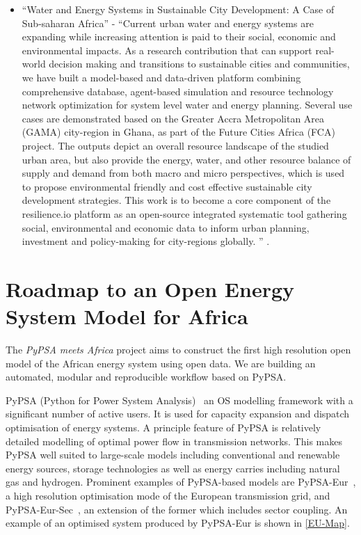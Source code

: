 \documentclass[conference, a4paper]{IEEEtran}
\begin{document}
\begin{itemize}
\item ``Water and Energy Systems in Sustainable City Development: A Case of Sub-saharan Africa'' - ``Current urban water and energy systems are expanding while increasing attention is paid to their social, economic and environmental impacts. As a research contribution that can support real-world decision making and transitions to sustainable cities and communities, we have built a model-based and data-driven platform combining comprehensive database, agent-based simulation and resource technology network optimization for system level water and energy planning. Several use cases are demonstrated based on the Greater Accra Metropolitan Area (GAMA) city-region in Ghana, as part of the Future Cities Africa (FCA) project. The outputs depict an overall resource landscape of the studied urban area, but also provide the energy, water, and other resource balance of supply and demand from both macro and micro perspectives, which is used to propose environmental friendly and cost effective sustainable city development strategies. This work is to become a core component of the resilience.io platform as an open-source integrated systematic tool gathering social, environmental and economic data to inform urban planning, investment and policy-making for city-regions globally. '' \cite{wang-vandam-ea-2017}.
\end{itemize}

\newpage
\section{Roadmap to an Open Energy System Model for Africa}

The \emph{PyPSA meets Africa} project aims to construct the first high resolution open model of the African energy system using open data.
We are building an automated, modular and reproducible workflow based on PyPSA.

PyPSA (Python for Power System Analysis)~\cite{brown-horsch-ea-2018} an OS modelling framework with a significant number of active users.
It is used for capacity expansion and dispatch optimisation of energy systems.
A principle feature of PyPSA is relatively detailed modelling of optimal power flow in transmission networks.
This makes PyPSA well suited to large-scale models including conventional and renewable energy sources, storage technologies as well as energy carries including natural gas and hydrogen.
Prominent examples of PyPSA-based models are PyPSA-Eur~\cite{PyPSAEur}, a high resolution optimisation mode of the European transmission grid, and PyPSA-Eur-Sec~\cite{PyPSAEurSec}, an extension of the former which includes sector coupling.
An example of an optimised system produced by PyPSA-Eur is shown in \autoref{EU-Map}.
\end{document}
